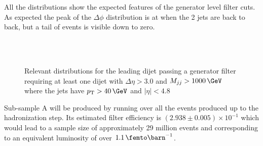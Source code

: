 All the distributions show the expected features of the generator level filter cuts. As expected the peak of the $\Delta\phi$ distribution is at \pi when the 2 jets are back to back, but a tail of events is visible down to zero.

\begin{figure}[!htp]%
\centering
{}\qquad
{}\\
\\
\caption{Relevant distributions for the leading dijet passing a generator filter requiring at least one dijet with $\Delta\eta>3.0$ and $M_{jj}>1000\,\GeV$ where the jets have $\pt>40\,\GeV$ and $|\eta|<4.8$}
\label{FIGURE:RunIIPreparation_PassGeneratorFilterDistributions2}
\end{figure}

Sub-sample A will be produced by running over all the events produced up to the hadronization step. Its estimated filter efficiency is $(2.938 \pm 0.005) \times 10^{-1}$ which would lead to a sample size of approximately 29 million events and corresponding to an equivalent luminosity of over $1.1\,\femto\barn^{-1}$.

